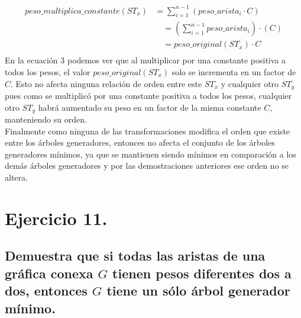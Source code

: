 \documentclass[12pt]{article}
\begin{document}
\begin{equation}
\begin{split}
peso\_multiplica\_constante(ST_x) & = \sum_{i=1}^{n - 1} (peso\_arista_i \cdot C ) \\
&\quad = (\sum_{i=1}^{n - 1} peso\_arista_i) \cdot (C) \\  
&\quad = peso\_original(ST_x) \cdot C\\  
\end{split}
\end{equation}
En la ecuación 3 podemos ver que al multiplicar por una constante positiva a todos los pesos, el valor $peso\_original(ST_x)$ solo se incrementa en un factor de $C$. Esto no afecta ninguna relación de orden entre este $ST_x$ y cualquier otro $ST_y$ pues como se multiplicó por una constante positiva a todos los pesos, cualquier otro $ST_y$ habrá aumentado su peso en un factor de la misma constante $C$, manteniendo su orden.\\
Finalmente como ninguna de las transformaciones modifica el orden que existe entre los árboles generadores, entonces no afecta el conjunto de los árboles generadores mínimos, ya que se mantienen siendo mínimos en comparación a los demás árboles generadores y por las demostraciones anteriores ese orden no se altera.\\
\section{Ejercicio 11.}
\subsection{Demuestra que si todas las aristas de una gráfica conexa $G$ tienen pesos diferentes dos a dos, entonces $G$ tiene un sólo árbol generador mínimo.}
\end{document}
